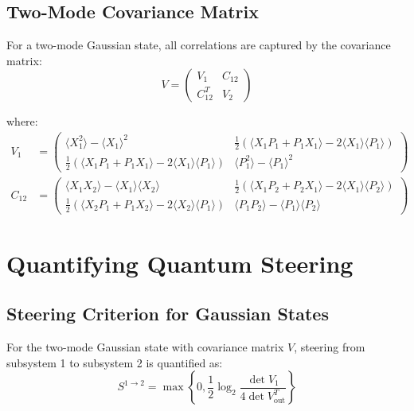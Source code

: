 \subsection{Two-Mode Covariance Matrix}

For a two-mode Gaussian state, all correlations are captured by the covariance matrix:
\begin{equation}
V = \begin{pmatrix}
V_1 & C_{12} \\
C_{12}^T & V_2
\end{pmatrix}
\end{equation}

where:
\begin{align}
V_1 &= \begin{pmatrix}
\langle X_1^2 \rangle - \langle X_1 \rangle^2 & \frac{1}{2}(\langle X_1 P_1 + P_1 X_1 \rangle - 2\langle X_1\rangle\langle P_1 \rangle) \\
\frac{1}{2}(\langle X_1 P_1 + P_1 X_1 \rangle - 2\langle X_1\rangle\langle P_1 \rangle) & \langle P_1^2 \rangle - \langle P_1 \rangle^2
\end{pmatrix} \\
C_{12} &= \begin{pmatrix}
\langle X_1 X_2 \rangle - \langle X_1\rangle\langle X_2 \rangle & \frac{1}{2}(\langle X_1 P_2 + P_2 X_1 \rangle - 2\langle X_1\rangle\langle P_2 \rangle) \\
\frac{1}{2}(\langle X_2 P_1 + P_1 X_2 \rangle - 2\langle X_2\rangle\langle P_1 \rangle) & \langle P_1 P_2 \rangle - \langle P_1\rangle\langle P_2 \rangle
\end{pmatrix}
\end{align}

\section{Quantifying Quantum Steering}

\subsection{Steering Criterion for Gaussian States}

For the two-mode Gaussian state with covariance matrix $V$, steering from subsystem 1 to subsystem 2 is quantified as:
\begin{equation}
S^{1 \to 2} = \max\left\{0, \frac{1}{2}\log_2\frac{\det V_1}{4\det V_{\text{out}}^T}\right\}
\end{equation}

